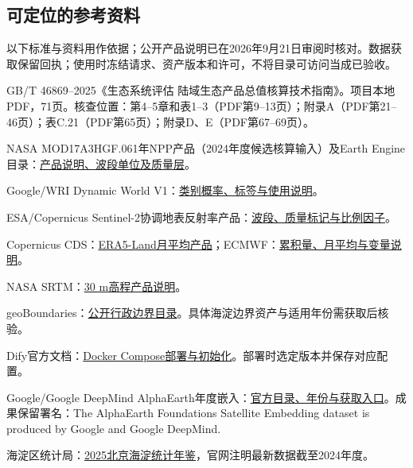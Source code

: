 \documentclass[12pt,a4paper,fontset=fandol]{ctexart}
\begin{document}
\subsection{可定位的参考资料}
以下标准与资料用作依据；公开产品说明已在2026年9月21日审阅时核对。数据获取保留回执；使用时冻结请求、资产版本和许可，不将目录可访问当成已验收。
\begin{enumerate}[label={[\arabic*]}]
\item GB/T 46869--2025《生态系统评估 陆域生态产品总值核算技术指南》。项目本地PDF，71页。核查位置：第4--5章和表1--3（PDF第9--13页）；附录A（PDF第21--46页）；表C.21（PDF第65页）；附录D、E（PDF第67--69页）。
\item NASA MOD17A3HGF.061年NPP产品（2024年度候选核算输入）及Earth Engine目录：\href{https://developers.google.com/earth-engine/datasets/catalog/MODIS_061_MOD17A3HGF}{产品说明、波段单位及质量层}。
\item Google/WRI Dynamic World V1：\href{https://developers.google.com/earth-engine/datasets/catalog/GOOGLE_DYNAMICWORLD_V1}{类别概率、标签与使用说明}。
\item ESA/Copernicus Sentinel-2协调地表反射率产品：\href{https://developers.google.com/earth-engine/datasets/catalog/COPERNICUS_S2_SR_HARMONIZED}{波段、质量标记与比例因子}。
\item Copernicus CDS：\href{https://cds.climate.copernicus.eu/datasets/reanalysis-era5-land-monthly-means?tab=overview}{ERA5-Land月平均产品}；ECMWF：\href{https://confluence.ecmwf.int/pages/viewpage.action?pageId=505384848}{累积量、月平均与变量说明}。
\item NASA SRTM：\href{https://developers.google.com/earth-engine/datasets/catalog/USGS_SRTMGL1_003}{30 m高程产品说明}。
\item geoBoundaries：\href{https://www.geoboundaries.org/}{公开行政边界目录}。具体海淀边界资产与适用年份需获取后核验。
\item Dify官方文档：\href{https://docs.dify.ai/en/self-host/deploy/quick-start/docker-compose}{Docker Compose部署与初始化}。部署时选定版本并保存对应配置。
\item Google/Google DeepMind AlphaEarth年度嵌入：\href{https://developers.google.com/earth-engine/datasets/catalog/GOOGLE_SATELLITE_EMBEDDING_V1_ANNUAL}{官方目录、年份与获取入口}。成果保留署名：The AlphaEarth Foundations Satellite Embedding dataset is produced by Google and Google DeepMind.
\item 海淀区统计局：\href{https://zyk.bjhd.gov.cn/sjkf/ndsj/202601/t20260104_4799659.shtml}{2025北京海淀统计年鉴}，官网注明最新数据截至2024年度。

\end{enumerate}
\end{document}
